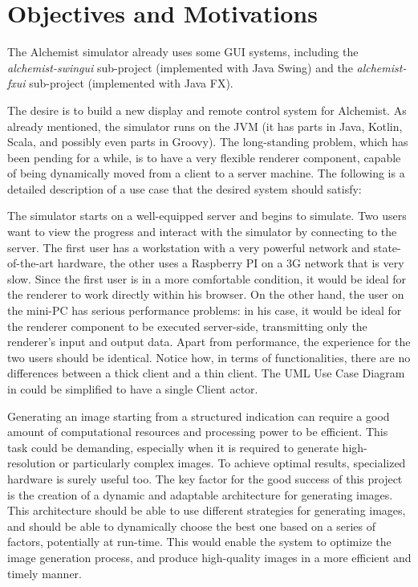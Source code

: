 \section{Objectives and Motivations}
\label{sec:objectives-and-motivations}
The Alchemist simulator already uses some GUI systems, including the \textit{alchemist-swingui} sub-project (implemented with Java Swing) and the \textit{alchemist-fxui} sub-project (implemented with Java FX).\newline

The desire is to build a new display and remote control system for Alchemist. As already mentioned, the simulator runs on the JVM (it has parts in Java, Kotlin, Scala, and possibly even parts in Groovy). The long-standing problem, which has been pending for a while, is to have a very flexible renderer component, capable of being dynamically moved from a client to a server machine. The following is a detailed description of a use case that the desired system should satisfy:\newline


The simulator starts on a well-equipped server and begins to simulate. Two users want to view the progress and interact with the simulator by connecting to the server. The first user has a workstation with a very powerful network and state-of-the-art hardware, the other uses a Raspberry PI on a 3G network that is very slow. Since the first user is in a more comfortable condition, it would be ideal for the renderer to work directly within his browser. On the other hand, the user on the mini-PC has serious performance problems: in his case, it would be ideal for the renderer component to be executed server-side, transmitting only the renderer's input and output data. Apart from performance, the experience for the two users should be identical. Notice how, in terms of functionalities, there are no differences between a thick client and a thin client. The UML Use Case Diagram in  could be simplified to have a single Client actor.\newline

Generating an image starting from a structured indication can require a good amount of computational resources and processing power to be efficient. This task could be demanding, especially when it is required to generate high-resolution or particularly complex images. To achieve optimal results, specialized hardware is surely useful too. The key factor for the good success of this project is the creation of a dynamic and adaptable architecture for generating images. This architecture should be able to use different strategies for generating images, and should be able to dynamically choose the best one based on a series of factors, potentially at run-time. This would enable the system to optimize the image generation process, and produce high-quality images in a more efficient and timely manner.\newline

